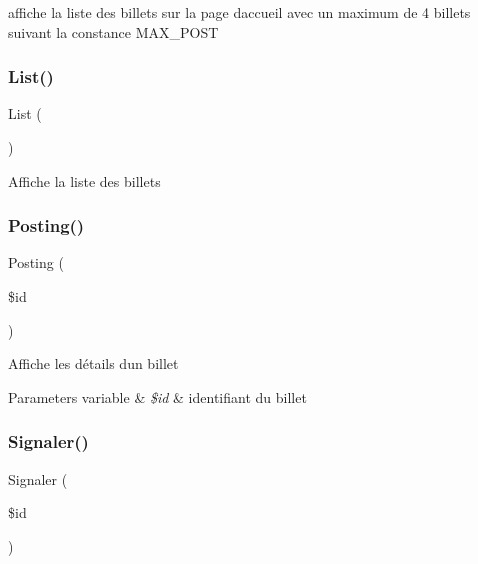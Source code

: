 affiche la liste des billets sur la page d\textquotesingle{}accueil avec un maximum de 4 billets suivant la constance M\+A\+X\+\_\+\+P\+O\+ST \mbox{\label{class_src_1_1_controllers_1_1_front_a17e6c90f14225bdac5c65ed915b0a2f6}} 
\subsubsection{\texorpdfstring{List()}{List()}}
{\footnotesize\ttfamily List (\begin{DoxyParamCaption}{ }\end{DoxyParamCaption})}

Affiche la liste des billets \mbox{\label{class_src_1_1_controllers_1_1_front_a5fcbe325afb03acc6e4eaec38a7bb1ae}} 
\subsubsection{\texorpdfstring{Posting()}{Posting()}}
{\footnotesize\ttfamily Posting (\begin{DoxyParamCaption}\item[{}]{\$id }\end{DoxyParamCaption})}

Affiche les détails d\textquotesingle{}un billet 
\begin{DoxyParams}[1]{Parameters}
variable & {\em \$id} & identifiant du billet \\
\hline
\end{DoxyParams}
\mbox{\label{class_src_1_1_controllers_1_1_front_a8b22c40bd1737bbb7db0816b7e9763b3}} 
\subsubsection{\texorpdfstring{Signaler()}{Signaler()}}
{\footnotesize\ttfamily Signaler (\begin{DoxyParamCaption}\item[{}]{\$id }\end{DoxyParamCaption})}

